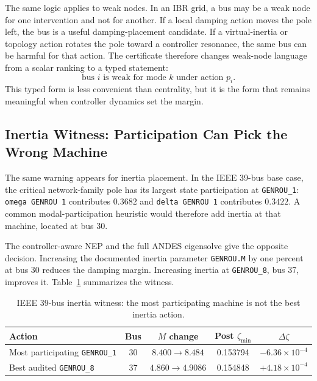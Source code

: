 \documentclass[conference]{IEEEtran}
\begin{document}
The same logic applies to weak nodes. In an IBR grid, a bus may be a weak node for one intervention and not for another. If a local damping action moves the pole left, the bus is a useful damping-placement candidate. If a virtual-inertia or topology action rotates the pole toward a controller resonance, the same bus can be harmful for that action. The certificate therefore changes weak-node language from a scalar ranking to a typed statement:
\[
\text{bus } i \text{ is weak for mode } k
\text{ under action } p_i .
\]
This typed form is less convenient than centrality, but it is the form that remains meaningful when controller dynamics set the margin.

\subsection{Inertia Witness: Participation Can Pick the Wrong Machine}

The same warning appears for inertia placement. In the IEEE 39-bus base case, the
critical network-family pole has its largest state participation at
\texttt{GENROU\_1}: \texttt{omega GENROU 1} contributes $0.3682$ and
\texttt{delta GENROU 1} contributes $0.3422$. A common modal-participation
heuristic would therefore add inertia at that machine, located at bus 30.

The controller-aware NEP and the full ANDES eigensolve give the opposite
decision. Increasing the documented inertia parameter \texttt{GENROU.M} by one
percent at bus 30 reduces the damping margin. Increasing inertia at
\texttt{GENROU\_8}, bus 37, improves it. Table~\ref{tab:inertia_witness}
summarizes the witness.

\begin{table}[t]
\caption{IEEE 39-bus inertia witness: the most participating machine is not the best inertia action.}
\label{tab:inertia_witness}
\centering
\scriptsize
\setlength{\tabcolsep}{2pt}
\begin{tabular}{lcccc}
\toprule
Action & Bus & $M$ change & Post $\zeta_{\min}$ & $\Delta\zeta$\\
\midrule
Most participating \texttt{GENROU\_1} & 30 &
$8.400\!\rightarrow\!8.484$ &
0.153794 & $-6.36{\times}10^{-4}$\\
Best audited \texttt{GENROU\_8} & 37 &
$4.860\!\rightarrow\!4.9086$ &
0.154848 & $+4.18{\times}10^{-4}$\\
\bottomrule
\end{tabular}
\end{table}
\end{document}
